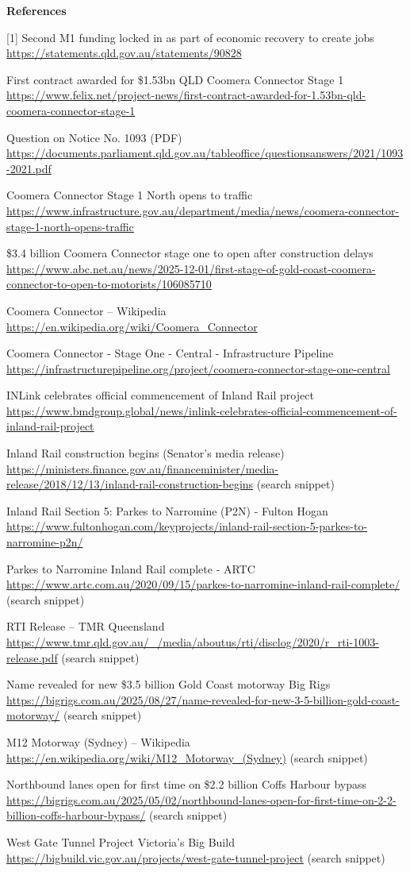 \documentclass[table]{gtech}
\begin{document}
\begin{tcolorbox}
\smallskip\noindent\textbf{References}\par\footnotesize\setlength{\parindent}{0pt}\setlength{\parskip}{2.5pt}
[1] Second M1 funding locked in as part of economic recovery to create jobs \url{https://statements.qld.gov.au/statements/90828}\par
[2] First contract awarded for \$1.53bn QLD Coomera Connector Stage 1 \url{https://www.felix.net/project-news/first-contract-awarded-for-1.53bn-qld-coomera-connector-stage-1}\par
[3] Question on Notice No. 1093 (PDF) \url{https://documents.parliament.qld.gov.au/tableoffice/questionsanswers/2021/1093-2021.pdf}\par
[4] Coomera Connector Stage 1 North opens to traffic \url{https://www.infrastructure.gov.au/department/media/news/coomera-connector-stage-1-north-opens-traffic}\par
[5] \$3.4 billion Coomera Connector stage one to open after construction delays \url{https://www.abc.net.au/news/2025-12-01/first-stage-of-gold-coast-coomera-connector-to-open-to-motorists/106085710}\par
[6] Coomera Connector -- Wikipedia \url{https://en.wikipedia.org/wiki/Coomera_Connector}\par
[7] Coomera Connector - Stage One - Central - Infrastructure Pipeline \url{https://infrastructurepipeline.org/project/coomera-connector-stage-one-central}\par
[8] INLink celebrates official commencement of Inland Rail project \url{https://www.bmdgroup.global/news/inlink-celebrates-official-commencement-of-inland-rail-project}\par
[9] Inland Rail construction begins (Senator's media release) \url{https://ministers.finance.gov.au/financeminister/media-release/2018/12/13/inland-rail-construction-begins} (search snippet)\par
[10] Inland Rail Section 5: Parkes to Narromine (P2N) - Fulton Hogan \url{https://www.fultonhogan.com/keyprojects/inland-rail-section-5-parkes-to-narromine-p2n/}\par
[11] Parkes to Narromine Inland Rail complete - ARTC \url{https://www.artc.com.au/2020/09/15/parkes-to-narromine-inland-rail-complete/} (search snippet)\par
[12] RTI Release -- TMR Queensland \url{https://www.tmr.qld.gov.au/_/media/aboutus/rti/disclog/2020/r_rti-1003-release.pdf} (search snippet)\par
[13] Name revealed for new \$3.5 billion Gold Coast motorway Big Rigs \url{https://bigrigs.com.au/2025/08/27/name-revealed-for-new-3-5-billion-gold-coast-motorway/} (search snippet)\par
[14] M12 Motorway (Sydney) -- Wikipedia \url{https://en.wikipedia.org/wiki/M12_Motorway_(Sydney)} (search snippet)\par
[15] Northbound lanes open for first time on \$2.2 billion Coffs Harbour bypass \url{https://bigrigs.com.au/2025/05/02/northbound-lanes-open-for-first-time-on-2-2-billion-coffs-harbour-bypass/} (search snippet)\par
[16] West Gate Tunnel Project Victoria's Big Build \url{https://bigbuild.vic.gov.au/projects/west-gate-tunnel-project} (search snippet)
\end{tcolorbox}
\end{document}
